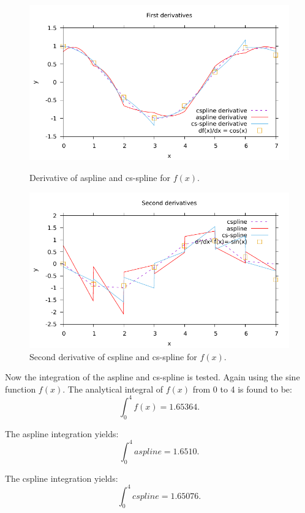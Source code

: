 \documentclass{article}
\begin{document}
\begin{figure}
\centering
\includegraphics[width=\linewidth]{dsplines.pdf}
\caption{Derivative of aspline and cs-spline for $f(x)$.}%
\label{fig:d}

\centering
\includegraphics[width=\linewidth]{d2splines.pdf}
\caption{Second derivative of cspline and cs-spline for $f(x)$.}%
\label{fig:d2}
\end{figure} 
\clearpage
Now the integration of the aspline and cs-spline is tested. Again using the sine function $f(x)$.
The analytical integral of $f(x)$ from 0 to 4 is found to be:
\begin{equation}
\int_0^4 f(x) = 1.65364. 
\end{equation}

The aspline integration yields:
\begin{equation}
\int_0^4 aspline = 1.6510. 
\end{equation}

The cspline integration  yields:
\begin{equation}
\int_0^4 cspline = 1.65076. 
\end{equation}
\end{document}
